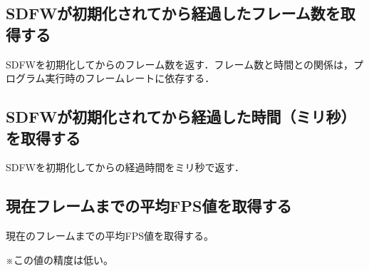\documentclass[a4paper, 11pt, oneside, onecolumn, openany]{jsarticle}
\begin{document}
\subsection{SDFWが初期化されてから経過したフレーム数を取得する}
SDFWを初期化してからのフレーム数を返す．フレーム数と時間との関係は，プログラム実行時のフレームレートに依存する．

\subsection{SDFWが初期化されてから経過した時間（ミリ秒）を取得する}
SDFWを初期化してからの経過時間をミリ秒で返す．

\subsection{現在フレームまでの平均FPS値を取得する}
現在のフレームまでの平均FPS値を取得する。\par
※この値の精度は低い。
\end{document}
